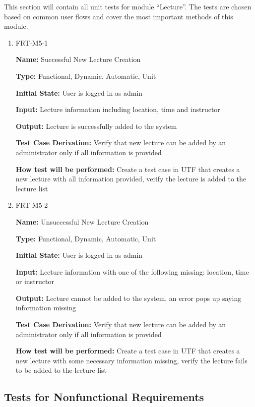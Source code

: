 \documentclass[12pt, titlepage]{article}
\begin{document}
This section will contain all unit tests for module ``Lecture''. The tests are chosen based on common user flows and cover the most important methods of this module.

\begin{enumerate}
\item{FRT-M5-1}

\textbf{Name:} Successful New Lecture Creation

\textbf{Type:} Functional, Dynamic, Automatic, Unit
					
\textbf{Initial State:} User is logged in as admin
					
\textbf{Input:} Lecture information including location, time and instructor
					
\textbf{Output:} Lecture is successfully added to the system

\textbf{Test Case Derivation:} Verify that new lecture can be added by an administrator only if all information is provided

\textbf{How test will be performed:} Create a test case in UTF that creates a new lecture with all information provided, verify the lecture is added to the lecture list

\item{FRT-M5-2}

\textbf{Name:} Unsuccessful New Lecture Creation

\textbf{Type:} Functional, Dynamic, Automatic, Unit
					
\textbf{Initial State:} User is logged in as admin
					
\textbf{Input:} Lecture information with one of the following missing: location, time or instructor
					
\textbf{Output:} Lecture cannot be added to the system, an error pops up saying information missing

\textbf{Test Case Derivation:} Verify that new lecture can be added by an administrator only if all information is provided

\textbf{How test will be performed:} Create a test case in UTF that creates a new lecture with some necessary information missing, verify the lecture fails to be added to the lecture list
\end{enumerate}

\subsection{Tests for Nonfunctional Requirements}
\end{document}
